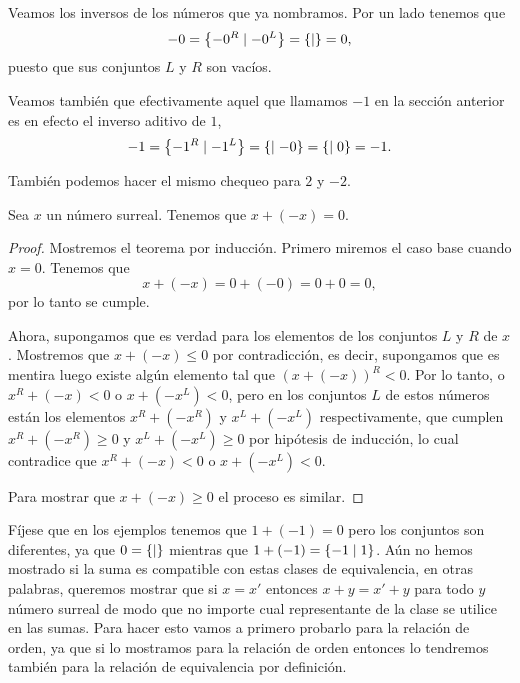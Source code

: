     \begin{example}
        Veamos los inversos de los n\'umeros que ya nombramos. Por un lado tenemos que
        \[
            -0 = \left\{-0^R\mid -0^L\right\} = \left\{\mid \right\} = 0,
        \]
        puesto que sus conjuntos $L$ y $R$ son vac\'ios.

        Veamos tambi\'en que efectivamente aquel que llamamos $-1$ en la secci\'on anterior es en efecto el inverso aditivo de $1$,
        \[
            -1 = \left\{-1^R\mid -1^L\right\} = \left\{\mid -0\right\} = \left\{\mid 0\right\} = -1.     
        \]

        Tambi\'en podemos hacer el mismo chequeo para $2$ y $-2$.
    \end{example}

    \begin{theorem}
        Sea $x$ un n\'umero surreal. Tenemos que $x+(-x)=0$.
    \end{theorem}

    \begin{proof}
        Mostremos el teorema por inducci\'on. Primero miremos el caso base cuando $x=0$. Tenemos que
        \[
            x + (-x) = 0 + (-0) = 0+0 = 0,
        \]
        por lo tanto se cumple.

        Ahora, supongamos que es verdad para los elementos de los conjuntos $L$ y $R$ de $x$. Mostremos que $x+(-x) \le 0$ por contradicci\'on, es decir, supongamos que es mentira luego existe alg\'un elemento tal que $(x+(-x))^R < 0$. Por lo tanto, o $x^R + (-x) < 0$ o $x+(-x^L) < 0$, pero en los conjuntos $L$ de estos n\'umeros est\'an los elementos $x^R + (-x^R)$ y $x^L + (-x^L)$ respectivamente, que cumplen  
        $x^R + (-x^R) \ge 0$ y $x^L + (-x^L)\ge 0$ por hip\'otesis de inducci\'on, lo cual contradice que $x^R + (-x) < 0$ o $x+(-x^L) < 0$.

        Para mostrar que $x+(-x) \ge 0$ el proceso es similar.
    \end{proof}


    F\'ijese que en los ejemplos tenemos que $1+(-1) = 0$ pero los conjuntos son diferentes, ya que $0=\left\{\mid \right\}$ mientras que $1+(-1) = \left\{-1\mid 1\right\}$. A\'un no hemos mostrado si la suma es compatible con estas clases de equivalencia, en otras palabras, queremos mostrar que si $x = x'$ entonces $x+y = x'+y$ para todo $y$ n\'umero surreal de modo que no importe cual representante de la clase se utilice en las sumas. Para hacer esto vamos a primero probarlo para la relaci\'on de orden, ya que si lo mostramos para la relaci\'on de orden entonces lo tendremos tambi\'en para la relaci\'on de equivalencia por definici\'on.

